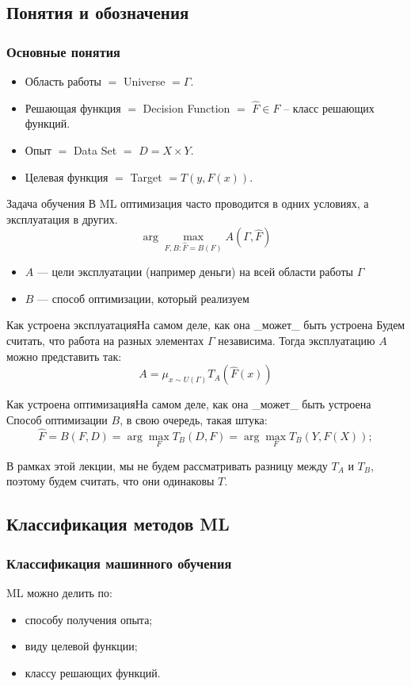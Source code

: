 \documentclass[14pt, fleqn, xcolor={dvipsnames, table}]{beamer}
\begin{document}
\subsection{Понятия и обозначения}
\begin{frame}
\frametitle{Основные понятия}
\begin{itemize}
	\item Область работы $=$ Universe $=\Gamma$.
	\item Решающая функция $=$ Decision Function $=$ $\hat{F} \in F$ -- класс решающих функций.
	\item Опыт $=$ Data Set $=$ $D = X \times Y$.
	\item Целевая функция $=$ Target $=T(y,F(x))$.
\end{itemize}
\end{frame}

\begin{frame}{Задача обучения}
В ML оптимизация часто проводится в одних условиях, а эксплуатация в других. 
$$
\arg \max_{F, B: \hat{F} = B(F)} A(\Gamma, \hat{F})
$$
\begin{itemize}
	\item $A$ --- цели эксплуатации (например деньги) на всей области работы $\Gamma$
	\item $B$ --- способ оптимизации, который реализуем
\end{itemize}
\end{frame}

\begin{frame}{Как устроена эксплуатация}{На самом деле, как она \_может\_ быть устроена}
Будем считать, что работа на разных элементах $\Gamma$ независима. Тогда эксплуатацию $A$ можно представить так:
$$
A=\mu_{x \sim U(\Gamma)} T_A(\hat{F}(x))
$$
\end{frame}

\begin{frame}{Как устроена оптимизация}{На самом деле, как она \_может\_ быть устроена}
Способ оптимизации $B$, в свою очередь, такая штука:
$$
\hat{F} = B(F, D) = \arg \max_{F} T_B(D, F) = \arg \max_{F} T_B(Y,F(X));
$$

В рамках этой лекции, мы не будем рассматривать разницу между $T_A$ и $T_B$, поэтому будем считать, что они одинаковы $T$.
\end{frame}

\subsection{Классификация методов ML}
\begin{frame}
\frametitle{Классификация машинного обучения}
ML можно делить по:
\begin{itemize}
	\item способу получения опыта;
	\item виду целевой функции;
	\item классу решающих функций.
\end{itemize}
\end{frame}
\end{document}
